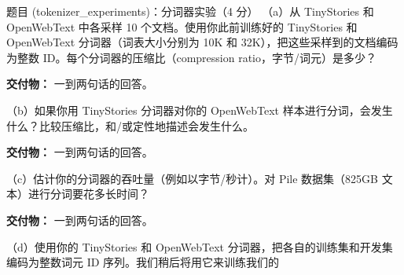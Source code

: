 \begin{problembox}{题目 (tokenizer\_experiments)：分词器实验（4 分）}
（a）从 TinyStories 和 OpenWebText 中各采样 10 个文档。使用你此前训练好的 TinyStories 和 OpenWebText 分词器（词表大小分别为 10K 和 32K），把这些采样到的文档编码为整数 ID。每个分词器的压缩比（compression ratio，字节/词元）是多少？

\textbf{交付物：} 一到两句话的回答。

\medskip
（b）如果你用 TinyStories 分词器对你的 OpenWebText 样本进行分词，会发生什么？比较压缩比，和/或定性地描述会发生什么。

\textbf{交付物：} 一到两句话的回答。

\medskip
（c）估计你的分词器的吞吐量（例如以字节/秒计）。对 Pile 数据集（825GB 文本）进行分词要花多长时间？

\textbf{交付物：} 一到两句话的回答。

\medskip
（d）使用你的 TinyStories 和 OpenWebText 分词器，把各自的训练集和开发集编码为整数词元 ID 序列。我们稍后将用它来训练我们的
\end{problembox}
